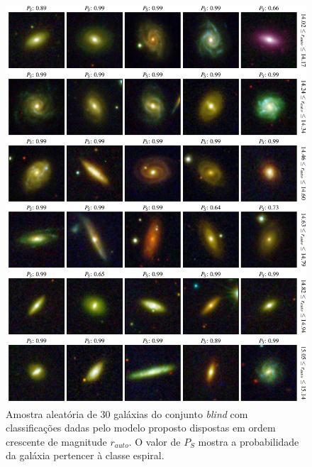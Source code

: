 \begin{figure}[!ht]
  \centering
  \includegraphics[width=0.95\linewidth]{figures/blind_preds_spir_1.pdf}
  \caption{Amostra aleatória de 30 galáxias do conjunto \emph{blind} com classificações dadas pelo modelo proposto dispostas em ordem crescente de magnitude $r_{auto}$. O valor de $P_S$ mostra a probabilidade da galáxia pertencer à classe espiral.}
  \label{fig:grid-s1}
\end{figure}

